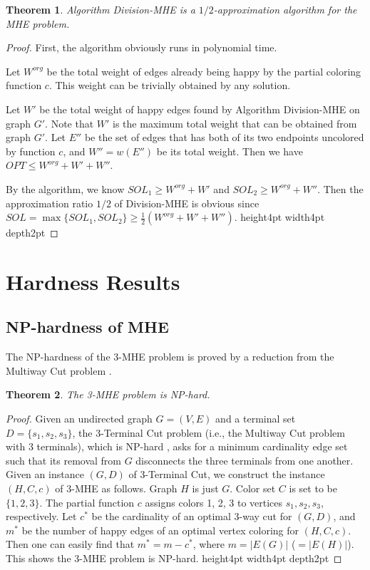 \documentclass[11pt]{article}
\newtheorem{theorem}{Theorem}[section]
\newcommand{\qed}{\vrule height4pt width4pt depth2pt}
\begin{document}
\begin{theorem}
\label{th - algorithm Division-MHE is a 1/2-approxalg}
Algorithm {\sc Division-MHE} is a $1/2$-approximation algorithm for
the MHE problem.
\end{theorem}
\begin{proof}
First, the algorithm obviously runs in polynomial time.

Let $W^{org}$ be the total weight of edges already being happy by
the partial coloring function $c$. This weight can be trivially obtained
by any solution.

Let $W'$ be the total weight of happy edges found by Algorithm
{\sc Division-MHE} on graph $G'$. Note that $W'$ is the maximum
total weight that can be obtained from graph $G'$.
Let $E''$ be the set of edges that has both of its two endpoints uncolored
by function $c$, and $W'' = w(E'')$ be its total weight.
Then we have $OPT \leq W^{org} + W' + W''$.

By the algorithm, we know $SOL_1 \geq W^{org} + W'$ and
$SOL_2 \geq W^{org} + W''$. Then the approximation ratio $1/2$ of
{\sc Division-MHE} is obvious
since $SOL = \max\{SOL_1, SOL_2\} \geq \frac12 (W^{org} + W' + W'')$.
\qed
\end{proof}





\section{Hardness Results}
\label{sec - Hardness results}




\subsection{NP-hardness of MHE}
\label{subsec - NP-hardness of MHE}
The NP-hardness of the $3$-MHE problem is proved by a reduction from
the Multiway Cut problem \cite{DJP+94}.

\begin{theorem}
\label{th - 3-MHE is NP-hard}
The 3-MHE problem is NP-hard.
\end{theorem}
\begin{proof}
Given an undirected graph $G = (V, E)$ and a terminal set $D = \{s_1, s_2, s_3\}$,
the 3-Terminal Cut problem (i.e., the Multiway Cut problem with
3 terminals), which is NP-hard \cite{DJP+94}, asks for a minimum cardinality
edge set such that its removal from $G$ disconnects the three terminals
from one another. Given an instance $(G, D)$ of 3-Terminal Cut, we construct
the instance $(H, C, c)$ of 3-MHE as follows.
Graph $H$ is just $G$. Color set $C$ is set to be $\{1, 2, 3\}$.
The partial function $c$ assigns colors 1, 2, 3 to vertices $s_1, s_2, s_3$,
respectively. Let $c^*$ be the cardinality of an optimal 3-way cut for
$(G, D)$, and $m^*$ be the number of happy edges of an optimal vertex
coloring for $(H, C, c)$. Then one can easily find that $m^* = m - c^*$,
where $m = |E(G)|$ ($=|E(H)|$). This shows the 3-MHE problem is NP-hard.
\qed
\end{proof}
\end{document}
